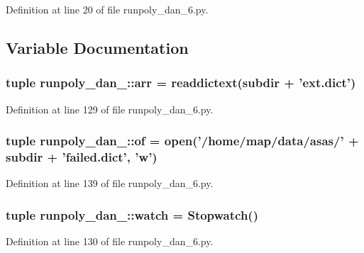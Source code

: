 Definition at line 20 of file runpoly\_\-dan\_\-6.py.



\subsection{Variable Documentation}
\hypertarget{namespacerunpoly__dan__6_a803cecbe1ce7548d0d8ad1bb0187c58d}{
\subsubsection[{arr}]{\setlength{\rightskip}{0pt plus 5cm}tuple {\bf runpoly\_\-dan\_::arr} = readdictext(subdir + 'ext.dict')}}
\label{namespacerunpoly__dan__6_a803cecbe1ce7548d0d8ad1bb0187c58d}


Definition at line 129 of file runpoly\_\-dan\_\-6.py.

\hypertarget{namespacerunpoly__dan__6_a968d46335b64a8264ff11552ce6e3c71}{
\subsubsection[{of}]{\setlength{\rightskip}{0pt plus 5cm}tuple {\bf runpoly\_\-dan\_::of} = open('/home/map/data/asas/' + subdir + 'failed.dict', 'w')}}
\label{namespacerunpoly__dan__6_a968d46335b64a8264ff11552ce6e3c71}


Definition at line 139 of file runpoly\_\-dan\_\-6.py.

\hypertarget{namespacerunpoly__dan__6_aecec7d148a3abcd06133fba8b9713579}{
\subsubsection[{watch}]{\setlength{\rightskip}{0pt plus 5cm}tuple {\bf runpoly\_\-dan\_::watch} = Stopwatch()}}
\label{namespacerunpoly__dan__6_aecec7d148a3abcd06133fba8b9713579}


Definition at line 130 of file runpoly\_\-dan\_\-6.py.

